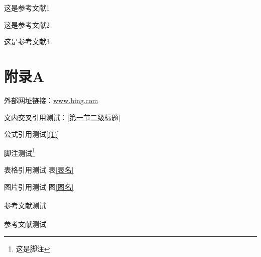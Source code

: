 \documentclass[a4paper,AutoFakeBold]{ctexart} %
\begin{document}
\begin{thebibliography}{99}
	这是参考文献1
	
	这是参考文献2
	
	这是参考文献3
\end{thebibliography}
\section*{附录A}
外部网址链接：\url{www.bing.com}

文内交叉引用测试：\ref{第一节二级标题}

公式引用测试\ref{(1)}

脚注测试\footnote{这是脚注}

表格引用测试 表\ref{表名}

图片引用测试 图\ref{图名}

参考文献测试\textsuperscript{\cite{参考文献1}}

参考文献测试\textsuperscript{\cite{参考文献1}\cite{参考文献2}}
\end{document}
